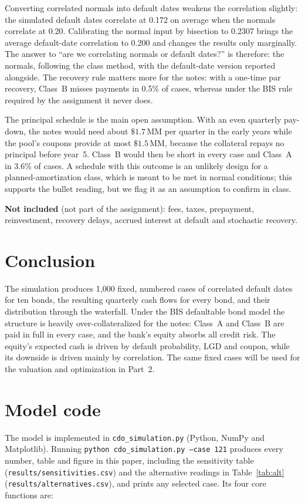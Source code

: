 \documentclass[11pt]{article}
\newcommand{\MM}{\,\text{MM}}
\begin{document}
\noindent Converting correlated normals into default dates weakens the correlation slightly: the simulated default dates
correlate at 0.172 on average when the normals correlate at 0.20. Calibrating the normal input by bisection to 0.2307 brings the
average default-date correlation to 0.200 and changes the results only marginally. The answer to ``are we correlating normals or default dates?'' is therefore: the normals,
following the class method, with the default-date version reported alongside. The recovery rule matters more for the notes: with a one-time par recovery, Class~B misses
payments in 0.5\% of cases, whereas under the BIS rule required by the assignment it never does.

\noindent The principal schedule is the main open assumption. With an even quarterly pay-down, the notes would need about
$\$1.7\MM$ per quarter in the early years while the pool's coupons provide at most $\$1.5\MM$, because the collateral repays no
principal before year~5. Class~B would then be short in every case and Class~A in 3.6\% of cases. A schedule with this outcome is an
unlikely design for a planned-amortization class, which is meant to be met in normal conditions; this supports the bullet reading,
but we flag it as an assumption to confirm in class.

\medskip
\noindent\textbf{Not included} (not part of the assignment): fees, taxes, prepayment, reinvestment, recovery delays, accrued
interest at default and stochastic recovery.

\section{Conclusion}
The simulation produces 1{,}000 fixed, numbered cases of correlated default dates for ten bonds, the resulting quarterly cash
flows for every bond, and their distribution through the waterfall. Under the BIS defaultable bond model the structure is heavily
over-collateralized for the notes: Class~A and Class~B are paid in full in every case, and the bank's equity absorbs all credit
risk. The equity's expected cash is driven by default probability, LGD and coupon, while its downside is driven mainly by
correlation. The same fixed cases will be used for the valuation and optimization in Part~2.

\appendix
\section{Model code}
The model is implemented in \texttt{cdo\_simulation.py} (Python, NumPy and Matplotlib). Running
\texttt{python cdo\_simulation.py --case 121} produces every number, table and figure in this paper, including the sensitivity table
(\texttt{results/sensitivities.csv}) and the alternative readings in Table~\ref{tab:alt} (\texttt{results/alternatives.csv}),
and prints any selected case. Its four core functions are:
\end{document}
